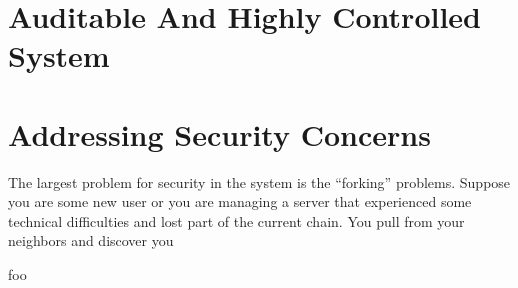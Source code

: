 \documentclass[11pt,letterpaper]{article}
\begin{document}
	
	
	
	
	
	
	\section{Auditable And Highly Controlled System}
	
	
	
	
	\section{Addressing Security Concerns}
	The largest problem for security in the system is the ``forking'' problems.
	Suppose you are some new user or you are managing a server that experienced some technical difficulties and lost part of the current chain.
	You pull from your neighbors and discover you
	
	foo \cite{camilleri2010playing}
	 \cite{tezos}
	
	
\end{document}

